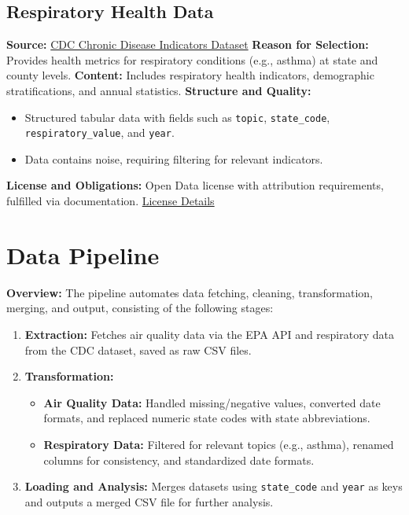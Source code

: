 \documentclass[a4paper,12pt]{article}
\begin{document}
\subsection*{Respiratory Health Data}
\textbf{Source:} \href{https://data.cdc.gov/Chronic-Disease-Indicators/U-S-Chronic-Disease-Indicators/hksd-2xuw}{CDC Chronic Disease Indicators Dataset}  
\textbf{Reason for Selection:} Provides health metrics for respiratory conditions (e.g., asthma) at state and county levels.  
\textbf{Content:} Includes respiratory health indicators, demographic stratifications, and annual statistics.  
\textbf{Structure and Quality:}
\begin{itemize}
    \item Structured tabular data with fields such as \texttt{topic}, \texttt{state\_code}, \texttt{respiratory\_value}, and \texttt{year}.
    \item Data contains noise, requiring filtering for relevant indicators.
\end{itemize}
\textbf{License and Obligations:}  
Open Data license with attribution requirements, fulfilled via documentation.  
\href{https://data.cdc.gov/about}{License Details}

\section*{Data Pipeline}

\textbf{Overview:}  
The pipeline automates data fetching, cleaning, transformation, merging, and output, consisting of the following stages:
\begin{enumerate}
    \item \textbf{Extraction:} Fetches air quality data via the EPA API and respiratory data from the CDC dataset, saved as raw CSV files.
    \item \textbf{Transformation:}
    \begin{itemize}
        \item \textbf{Air Quality Data:} Handled missing/negative values, converted date formats, and replaced numeric state codes with state abbreviations.
        \item \textbf{Respiratory Data:} Filtered for relevant topics (e.g., asthma), renamed columns for consistency, and standardized date formats.
    \end{itemize}
    \item \textbf{Loading and Analysis:} Merges datasets using \texttt{state\_code} and \texttt{year} as keys and outputs a merged CSV file for further analysis.
\end{enumerate}
\end{document}
